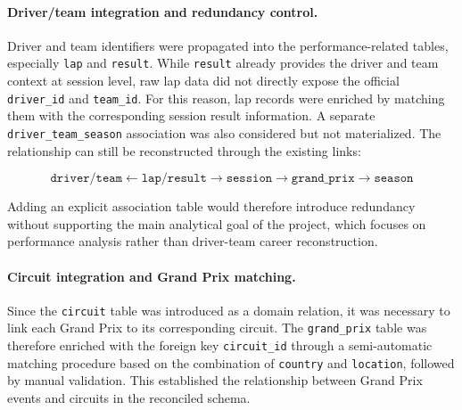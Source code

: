 \documentclass[11pt,a4paper]{article}
\begin{document}
	\paragraph{Driver/team integration and redundancy control.}
	Driver and team identifiers were propagated into the performance-related tables, especially \texttt{lap} and \texttt{result}. 
	While \texttt{result} already provides the driver and team context at session level, raw lap data did not directly expose the official \texttt{driver\_id} and \texttt{team\_id}. 
	For this reason, lap records were enriched by matching them with the corresponding session result information. A separate \texttt{driver\_team\_season} association was also considered but not materialized. 
	The relationship can still be reconstructed through the existing links:
	
	\[
	\texttt{driver/team}
	\leftarrow
	\texttt{lap/result}
	\rightarrow
	\texttt{session}
	\rightarrow
	\texttt{grand\_prix}
	\rightarrow
	\texttt{season}
	\]
	
	Adding an explicit association table would therefore introduce redundancy without supporting the main analytical goal of the project, which focuses on performance analysis rather than driver-team career reconstruction.
	
	\paragraph{Circuit integration and Grand Prix matching.}
	
	Since the \texttt{circuit} table was introduced as a domain relation, it was necessary to link each Grand Prix to its corresponding circuit. The \texttt{grand\_prix} table was therefore enriched with the foreign key \texttt{circuit\_id} through a semi-automatic matching procedure based on the combination of \texttt{country} and \texttt{location}, followed by manual validation. This established the relationship between Grand Prix events and circuits in the reconciled schema.
	
\end{document}
